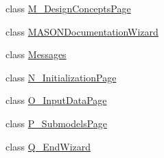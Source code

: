 \begin{DoxyCompactItemize}
\item 
class \hyperlink{classit_1_1isislab_1_1masonhelperdocumentation_1_1mason_1_1wizards_1_1_m___design_concepts_page}{M\-\_\-\-Design\-Concepts\-Page}
\item 
class \hyperlink{classit_1_1isislab_1_1masonhelperdocumentation_1_1mason_1_1wizards_1_1_m_a_s_o_n_documentation_wizard}{M\-A\-S\-O\-N\-Documentation\-Wizard}
\item 
class \hyperlink{classit_1_1isislab_1_1masonhelperdocumentation_1_1mason_1_1wizards_1_1_messages}{Messages}
\item 
class \hyperlink{classit_1_1isislab_1_1masonhelperdocumentation_1_1mason_1_1wizards_1_1_n___initialization_page}{N\-\_\-\-Initialization\-Page}
\item 
class \hyperlink{classit_1_1isislab_1_1masonhelperdocumentation_1_1mason_1_1wizards_1_1_o___input_data_page}{O\-\_\-\-Input\-Data\-Page}
\item 
class \hyperlink{classit_1_1isislab_1_1masonhelperdocumentation_1_1mason_1_1wizards_1_1_p___submodels_page}{P\-\_\-\-Submodels\-Page}
\item 
class \hyperlink{classit_1_1isislab_1_1masonhelperdocumentation_1_1mason_1_1wizards_1_1_q___end_wizard}{Q\-\_\-\-End\-Wizard}
\end{DoxyCompactItemize}
